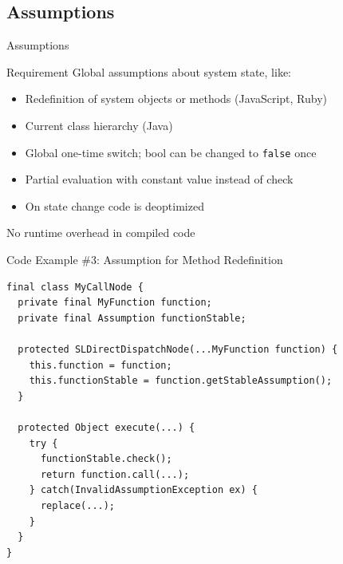 \documentclass[xcolor=dvipsname,handout]{beamer}
\begin{document}
\subsection{Assumptions}
\begin{frame}{Assumptions}
    \begin{alertblock}{Requirement}
        Global assumptions about system state, like:
        \begin{itemize}
          \item Redefinition of system objects or methods (JavaScript, Ruby)
          \item Current class hierarchy (Java)
        \end{itemize}
    \end{alertblock}
    \pause
    \vfill
    \begin{itemize}
        \item Global one-time switch; bool can be changed to \lstinline{false} once
        \pause
        \item Partial evaluation with constant value instead of check
        \pause
        \item On state change code is deoptimized
    \end{itemize}
    \pause
    \begin{center}
        \alert{No runtime overhead in compiled code}
    \end{center}
\end{frame}
\begin{frame}[fragile]{Code Example \#3: Assumption for Method Redefinition}
  \begin{lstlisting}
final class MyCallNode {
  private final MyFunction function;
  private final Assumption functionStable;

  protected SLDirectDispatchNode(...MyFunction function) {
    this.function = function;
    this.functionStable = function.getStableAssumption();
  }

  protected Object execute(...) {
    try {
      functionStable.check();
      return function.call(...);
    } catch(InvalidAssumptionException ex) {
      replace(...);
    }
  }
}
  \end{lstlisting}
\end{frame}
\end{document}
